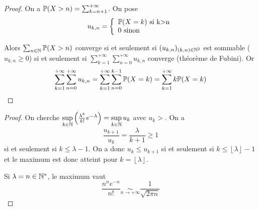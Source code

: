 \begin{proof}
    On a $\P(X>n)=\sum_{k=n+1}^{+\infty}$. On pose 
    \begin{equation}
        u_{k,n}=
        \left\lbrace
            \begin{array}[]{l}
                \P(X=k)\text{ si k>n}\\
                0 \text{ sinon}
            \end{array}
        \right.
    \end{equation}

    Alors $\sum_{n\in\N}\P(X>n)$ converge si et seulement si $(u_{k,n})_{(k,n)\in\N^{2}}$ est sommable ($u_{k,n}\geqslant0$) si et seulement si $\sum_{k=1}^{+\infty}\sum_{n=0}^{+\infty}u_{k,n}$ converge (théorème de Fubini). Or 
    \begin{equation}
        \sum_{k=1}^{+\infty}\sum_{n=0}^{+\infty}u_{k,n}=\sum_{k=1}^{+\infty}\sum_{n=0}^{k-1}\P(X=k)=\sum_{k=1}^{+\infty}k\P(X=k)
    \end{equation}
\end{proof}

\begin{proof}
    On cherche $\sup\limits_{k\in\N}\left(\frac{\lambda^{k}}{k!}e^{-\lambda}\right)=\sup\limits_{k\in\N}u_{k}$ avec $u_{k}>$. On a 
    \begin{equation}
        \frac{u_{k+1}}{u_{k}}=\frac{\lambda}{k+1}\geqslant 1 
    \end{equation}
    si et seulement si $k\leqslant\lambda-1$. On a donc $u_{k}\leqslant u_{k+1}$ si et seulement si $k\leqslant \left\lfloor\lambda\right\rfloor-1$ et le maximum est donc atteint pour $k=\left\lfloor\lambda\right\rfloor$.

    Si $\lambda=n\in\N^{*}$, le maximum vaut 
    \begin{equation}
        \frac{n^{n}e^{-n}}{n!}\underset{n\to+\infty}{\sim}\frac{1}{\sqrt{2\pi n}}
    \end{equation}
\end{proof}

